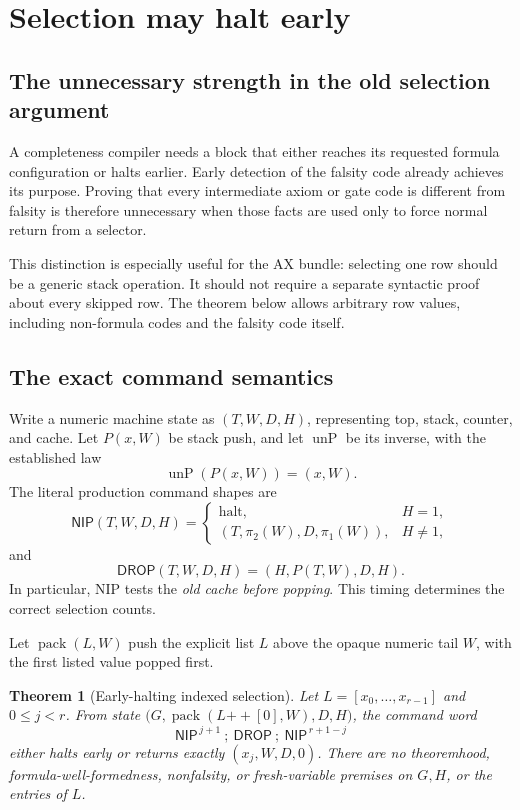 \documentclass[11pt]{article}
\newcommand{\NIP}{\mathsf{NIP}}
\newcommand{\DROP}{\mathsf{DROP}}
\newtheorem{theorem}{Theorem}[section]
\theoremstyle{remark}
\begin{document}
\section{Selection may halt early}
\label{sec:selection}

\subsection{The unnecessary strength in the old selection argument}

A completeness compiler needs a block that either reaches its requested
formula configuration or halts earlier. Early detection of the falsity code
already achieves its purpose. Proving that every intermediate axiom or gate
code is different from falsity is therefore unnecessary when those facts
are used only to force normal return from a selector.

This distinction is especially useful for the AX bundle: selecting one row
should be a generic stack operation. It should not require a separate
syntactic proof about every skipped row. The theorem below allows arbitrary
row values, including non-formula codes and the falsity code itself.

\subsection{The exact command semantics}

Write a numeric machine state as \((T,W,D,H)\), representing top, stack,
counter, and cache. Let \(P(x,W)\) be stack push, and let
\(\operatorname{unP}\) be its inverse, with the established law
\[
\operatorname{unP}(P(x,W))=(x,W).
\]
The literal production command shapes are \cite{compiler}
\[
\NIP(T,W,D,H)=
\begin{cases}
\mathrm{halt},&H=1,\\
(T,\pi_2(W),D,\pi_1(W)),&H\ne1,
\end{cases}
\]
and
\[
\DROP(T,W,D,H)=(H,P(T,W),D,H).
\]
In particular, NIP tests the \emph{old cache before popping}. This timing
determines the correct selection counts.

Let \(\operatorname{pack}(L,W)\) push the explicit list \(L\) above the
opaque numeric tail \(W\), with the first listed value popped first.

\begin{samepage}
\begin{theorem}[Early-halting indexed selection]
\label{thm:selection}
Let \(L=[x_0,\ldots,x_{r-1}]\) and \(0\le j<r\).
From state
\(\bigl(G,\operatorname{pack}(L\mathbin{+\!\!+}[0],W),D,H\bigr)\),
the command word
\[
\NIP^{\,j+1}\ ;\ \DROP\ ;\ \NIP^{\,r+1-j}
\]
either halts early or returns exactly \((x_j,W,D,0)\).
There are no theoremhood, formula-well-formedness, nonfalsity, or
fresh-variable premises on \(G,H\), or the entries of \(L\).
\end{theorem}
\end{samepage}
\end{document}
